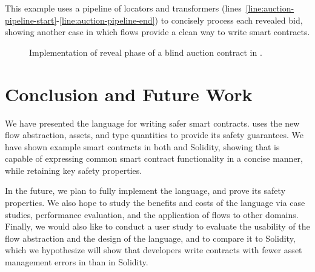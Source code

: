\documentclass[nonacm, dvipsnames, sigconf]{acmart}
\begin{document}
This example uses a pipeline of locators and transformers (lines~\ref{line:auction-pipeline-start}-\ref{line:auction-pipeline-end}) to concisely process each revealed bid, showing another case in which flows provide a clean way to write smart contracts.

\begin{figure}
    \centering
    
    \caption{Implementation of reveal phase of a blind auction contract in \langName.}
    \label{fig:blind-auction-impl-flow}
\end{figure}

\section{Conclusion and Future Work}

We have presented the \langName language for writing safer smart contracts.
\langName uses the new flow abstraction, assets, and type quantities to provide its safety guarantees.
We have shown example smart contracts in both \langName and Solidity, showing that \langName is capable of expressing common smart contract functionality in a concise manner, while retaining key safety properties.

In the future, we plan to fully implement the \langName language, and prove its safety properties.
We also hope to study the benefits and costs of the language via case studies, performance evaluation, and the application of flows to other domains.
Finally, we would also like to conduct a user study to evaluate the usability of the flow abstraction and the design of the language, and to compare it to Solidity, which we hypothesize will show that developers write contracts with fewer asset management errors in \langName than in Solidity.



\end{document}
